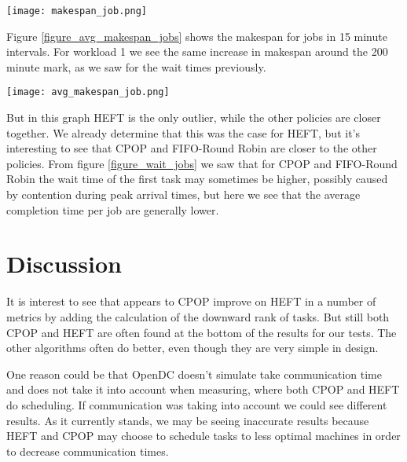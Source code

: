 \documentclass[twocolumn,a4]{scrartcl}
\begin{document}
\begin{figure*}[p]
  \centering
  \texttt{[image: makespan\_job.png]}
  \caption{Makespan for jobs for workload 1 (top) and workload 2 (bottom), using setup 1 (left) and setup 2 (right)}
  \label{figure_makespan_jobs}
\end{figure*}

Figure \ref{figure_avg_makespan_jobs} shows the makespan for jobs in 15 minute intervals. For workload 1 we see the same increase in makespan around the 200 minute mark, as we saw for the wait times previously.

\begin{figure*}[p]
  \centering
  \texttt{[image: avg\_makespan\_job.png]}
  \caption{Makespan for jobs in intervals of 15 minutes for workload 1 (top) and workload 2 (bottom), using setup 1 (left) and setup 2 (right)}
  \label{figure_avg_makespan_jobs}
\end{figure*}

But in this graph HEFT is the only outlier, while the other policies are closer together. We already determine that this was the case for HEFT, but it's interesting to see that CPOP and FIFO-Round Robin are closer to the other policies. From figure \ref{figure_wait_jobs} we saw that for CPOP and FIFO-Round Robin the wait time of the first task may sometimes be higher, possibly caused by contention during peak arrival times, but here we see that the average completion time per job are generally lower.

\section{Discussion} \label{sec_discussion}

It is interest to see that appears to CPOP improve on HEFT in a number of metrics by adding the calculation of the downward rank of tasks. But still both CPOP and HEFT are often found at the bottom of the results for our tests. The other algorithms often do better, even though they are very simple in design.

One reason could be that OpenDC doesn't simulate take communication time and does not take it into account when measuring, where both CPOP and HEFT do scheduling. If communication was taking into account we could see different results. As it currently stands, we may be seeing inaccurate results because HEFT and CPOP may choose to schedule tasks to less optimal machines in order to decrease communication times.
\end{document}

